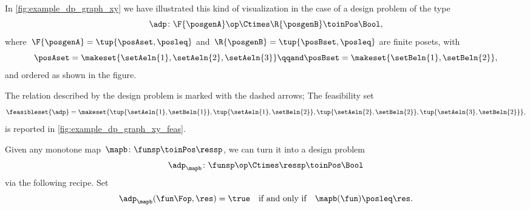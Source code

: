 \begin{marginfigure}
    \centering
    \caption{}
    \label{fig:example_dp_graph_xy}
\end{marginfigure}
\begin{marginfigure}
    \centering
    \caption{}
    \label{fig:example_dp_graph_xy_feas}
\end{marginfigure}

\begin{example}
    \label{exa:visualize-dp}
    In \cref{fig:example_dp_graph_xy} we have illustrated this kind of visualization in the case of a design problem of the type
    \begin{equation}
        \adp \colon \F{\posgenA} \op \Ctimes  \R{\posgenB} \toinPos \Bool,
    \end{equation}
    where~$\F{\posgenA} = \tup{\posAset, \posleq}$ and~$ \R{\posgenB} = \tup{\posBset, \posleq}$ are finite posets, with
    \begin{equation}
        \posAset = \makeset{ \setAeln{1}, \setAeln{2}, \setAeln{3} }
        \qqand
        \posBset =  \makeset{ \setBeln{1}, \setBeln{2}},
    \end{equation}
    and ordered as shown in the figure.

    The relation described by the design problem is marked with the dashed arrows;
    The feasibility set
    \begin{equation}
        \feasibleset{\adp} = \makeset{\tup{\setAeln{1}, \setBeln{1}}, \tup{\setAeln{1}, \setBeln{2}}, \tup{\setAeln{2}, \setBeln{2}}, \tup{\setAeln{3}, \setBeln{2}} },
    \end{equation}
    is reported in \cref{fig:example_dp_graph_xy_feas}.
\end{example}

\begin{remark}
    \label{re:dp-from-monotone}
    Given any monotone map~$\mapb\colon \funsp \toinPos \ressp$, we can turn it into a design problem
    \begin{equation}
        \adp_\mapb \colon \funsp\op \Ctimes \ressp \toinPos \Bool
    \end{equation}
    via the following recipe.
    Set
    \begin{equation}
        \adp_\mapb (\fun\Fop, \res) = \true \quad \text{if and only if} \quad \mapb(\fun) \posleq \res.
    \end{equation}
\end{remark}

